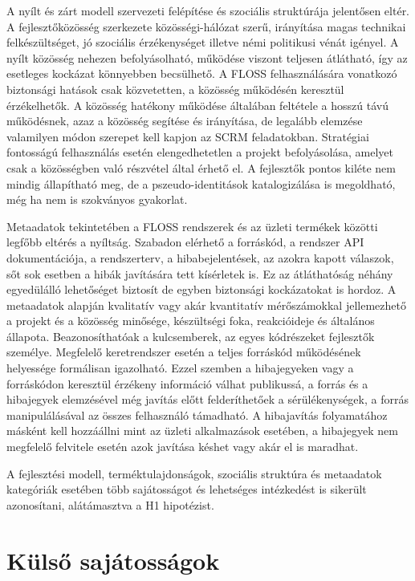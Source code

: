 \documentclass[12pt,magyar,a4paper,oneside]{scrreprt}
\begin{document}
A nyílt és zárt modell szervezeti felépítése és szociális struktúrája
jelentősen eltér. A fejlesztőközösség szerkezete közösségi-hálózat
szerű, irányítása magas technikai felkészültséget, jó szociális
érzékenységet illetve némi politikusi vénát igényel. A nyílt közösség
nehezen befolyásolható, működése viszont teljesen átlátható, így az
esetleges kockázat könnyebben becsülhető. A FLOSS felhasználására
vonatkozó biztonsági hatások csak közvetetten, a közösség működésén
keresztül érzékelhetők. A közösség hatékony működése általában feltétele
a hosszú távú működésnek, azaz a közösség segítése és irányítása, de
legalább elemzése valamilyen módon szerepet kell kapjon az SCRM
feladatokban. Stratégiai fontosságú felhasználás esetén elengedhetetlen
a projekt befolyásolása, amelyet csak a közösségben való részvétel által
érhető el. A fejlesztők pontos kiléte nem mindig állapítható meg, de a
pszeudo-identitások katalogizálása is megoldható, még ha nem is
szokványos gyakorlat.

Metaadatok tekintetében a FLOSS rendszerek és az üzleti termékek közötti
legfőbb eltérés a nyíltság. Szabadon elérhető a forráskód, a rendszer
API dokumentációja, a rendszerterv, a hibabejelentések, az azokra kapott
válaszok, sőt sok esetben a hibák javítására tett kísérletek is. Ez az
átláthatóság néhány egyedülálló lehetőséget biztosít de egyben
biztonsági kockázatokat is hordoz. A metaadatok alapján kvalitatív vagy
akár kvantitatív mérőszámokkal jellemezhető a projekt és a közösség
minősége, készültségi foka, reakcióideje és általános állapota.
Beazonosíthatóak a kulcsemberek, az egyes kódrészeket fejlesztők
személye. Megfelelő keretrendszer esetén a teljes forráskód működésének
helyessége formálisan igazolható. Ezzel szemben a hibajegyeken vagy a
forráskódon keresztül érzékeny információ válhat publikussá, a forrás és
a hibajegyek elemzésével még javítás előtt felderíthetőek a
sérülékenységek, a forrás manipulálásával az összes felhasználó
támadható. A hibajavítás folyamatához másként kell hozzáállni mint az
üzleti alkalmazások esetében, a hibajegyek nem megfelelő felvitele
esetén azok javítása késhet vagy akár el is maradhat.

A fejlesztési modell, terméktulajdonságok, szociális struktúra és
metaadatok kategóriák esetében több sajátosságot és lehetséges
intézkedést is sikerült azonosítani, alátámasztva a H1 hipotézist.

\hypertarget{sec:FLOSSKULSO}{%
\chapter{Külső sajátosságok}\label{sec:FLOSSKULSO}}
\end{document}
